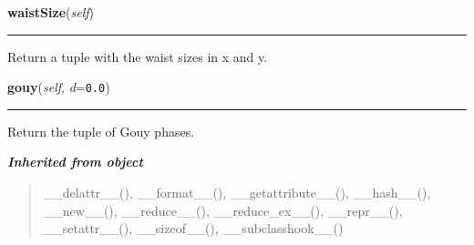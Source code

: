     \label{theia:optics:beam:GaussianBeam:waistSize}

    \vspace{0.5ex}

\hspace{.8\funcindent}\begin{boxedminipage}{\funcwidth}

    \raggedright \textbf{waistSize}(\textit{self})

    \vspace{-1.5ex}

    \rule{\textwidth}{0.5\fboxrule}
\setlength{\parskip}{2ex}
    Return a tuple with the waist sizes in x and y.

\setlength{\parskip}{1ex}
    \end{boxedminipage}

    \label{theia:optics:beam:GaussianBeam:gouy}

    \vspace{0.5ex}

\hspace{.8\funcindent}\begin{boxedminipage}{\funcwidth}

    \raggedright \textbf{gouy}(\textit{self}, \textit{d}={\tt 0.0})

    \vspace{-1.5ex}

    \rule{\textwidth}{0.5\fboxrule}
\setlength{\parskip}{2ex}
    Return the tuple of Gouy phases.

\setlength{\parskip}{1ex}
    \end{boxedminipage}


\large{\textbf{\textit{Inherited from object}}}

\begin{quote}
\_\_delattr\_\_(), \_\_format\_\_(), \_\_getattribute\_\_(), \_\_hash\_\_(), \_\_new\_\_(), \_\_reduce\_\_(), \_\_reduce\_ex\_\_(), \_\_repr\_\_(), \_\_setattr\_\_(), \_\_sizeof\_\_(), \_\_subclasshook\_\_()
\end{quote}


